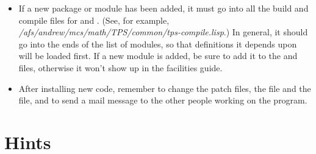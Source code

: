 \begin{itemize}
\item If a new package or module has been added, it must go into all the build and
compile files for \ETPS and \tps. (See, for example,
{\it /afs/andrew/mcs/math/TPS/common/tps-compile.lisp}.)  In general, it should
go into the ends of the list of modules, so that definitions it
depends upon will be loaded first. If a new module is added, be sure to add it 
to the {\it {}} and {\it {}}
files, otherwise it won't show up in the facilities guide.

\item After installing new code, remember to change the patch files, the {\it {}}
file and the {\it {}} file, and to send a mail message to the other 
people working on the program.
\end{itemize}

\section{ Hints}

